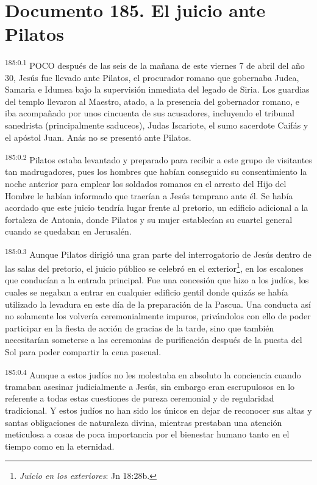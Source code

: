 \chapter{Documento 185. El juicio ante Pilatos}
\par 
\textsuperscript{185:0.1} POCO después de las seis de la mañana de este viernes 7 de abril del año 30, Jesús fue llevado ante Pilatos, el procurador romano que gobernaba Judea, Samaria e Idumea bajo la supervisión inmediata del legado de Siria. Los guardias del templo llevaron al Maestro, atado, a la presencia del gobernador romano, e iba acompañado por unos cincuenta de sus acusadores, incluyendo el tribunal sanedrista
(principalmente saduceos), Judas Iscariote, el sumo sacerdote Caifás y el apóstol Juan. Anás no se presentó ante Pilatos.

\par 
\textsuperscript{185:0.2} Pilatos estaba levantado y preparado para recibir a este grupo de visitantes tan madrugadores, pues los hombres que habían conseguido su consentimiento la noche anterior para emplear los soldados romanos en el arresto del Hijo del Hombre le habían informado que traerían a Jesús temprano ante él. Se había acordado que este juicio tendría lugar frente al pretorio, un edificio adicional a la fortaleza de Antonia, donde Pilatos y su mujer establecían su cuartel general cuando se quedaban en Jerusalén.

\par 
\textsuperscript{185:0.3} Aunque Pilatos dirigió una gran parte del interrogatorio de Jesús dentro de las salas del pretorio, el juicio público se celebró en el exterior\footnote{\textit{Juicio en los exteriores}: Jn 18:28b.}, en los escalones que conducían a la entrada principal. Fue una concesión que hizo a los judíos, los cuales se negaban a entrar en cualquier edificio gentil donde quizás se había utilizado la levadura en este día de la preparación de la Pascua. Una conducta así no solamente los volvería ceremonialmente impuros, privándolos con ello de poder participar en la fiesta de acción de gracias de la tarde, sino que también necesitarían someterse a las ceremonias de purificación después de la puesta del Sol para poder compartir la cena pascual.

\par 
\textsuperscript{185:0.4} Aunque a estos judíos no les molestaba en absoluto la conciencia cuando tramaban asesinar judicialmente a Jesús, sin embargo eran escrupulosos en lo referente a todas estas cuestiones de pureza ceremonial y de regularidad tradicional. Y estos judíos no han sido los únicos en dejar de reconocer sus altas y santas obligaciones de naturaleza divina, mientras prestaban una atención meticulosa a cosas de poca importancia por el bienestar humano tanto en el tiempo como en la eternidad.

